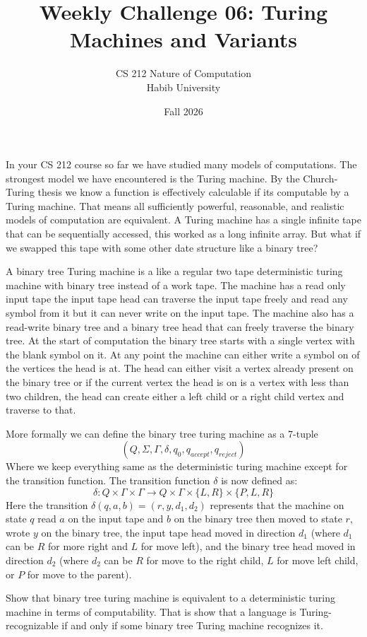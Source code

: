 \documentclass[a4paper]{exam}
\title{Weekly Challenge 06: Turing Machines and Variants}
\author{CS 212 Nature of Computation\\Habib University}
\date{Fall 2026}
\begin{document}
\maketitle

\begin{questions}
    In your CS 212 course so far we have studied many models of computations. The strongest model we have encountered is the Turing machine. By the Church-Turing thesis we know a function is effectively calculable if its computable by a Turing machine. That means all sufficiently powerful, reasonable, and realistic models of computation are equivalent. A Turing machine has a single infinite tape that can be sequentially accessed, this worked as a long infinite array. But what if we swapped this tape with some other date structure like a binary tree? 

    A binary tree Turing machine is a like a regular two tape deterministic turing machine with binary tree instead of a work tape. The machine has a read only input tape the input tape head can traverse the input tape freely and read any symbol from it but it can never write on the input tape. The machine also has a read-write binary tree and a binary tree head that can freely traverse the binary tree. At the start of computation the binary tree starts with a single vertex with the blank symbol on it. At any point the machine can either write a symbol on of the vertices the head is at. The head can either visit a vertex already present on the binary tree or if the current vertex the head is on is a vertex with less than two children, the head can create either a left child or a right child vertex and traverse to that.  

    More formally we can define the binary tree turing machine as a 7-tuple 
    $$(Q, \Sigma, \Gamma, \delta, q_0, q_{accept}, q_{reject})$$ 
    Where we keep everything same as the deterministic turing machine except for the transition function. The transition function $\delta$ is now defined as: 
    $$\delta: Q \times \Gamma \times \Gamma \to Q \times \Gamma \times\{L,R\} \times \{P, L, R\}$$
    Here the transition $\delta(q,a,b) = (r,y,d_1,d_2)$ represents that the machine on state $q$ read $a$ on the input tape and $b$ on the binary tree then moved to state $r$, wrote $y$ on the binary tree, the input tape head moved in direction $d_1$ (where $d_1$ can be $R$ for more right and $L$ for move left), and the binary tree head moved in direction $d_2$ (where $d_2$ can be $R$ for move to the right child, $L$ for move left child, or $P$ for move to the parent).

   Show that binary tree turing machine is equivalent to a deterministic turing machine in terms of computability. That is show that a language is Turing-recognizable if and only if some binary tree Turing machine recognizes it.
 
    \begin{solution}
    \end{solution}
    
    

    
  
\end{questions}
\end{document}
